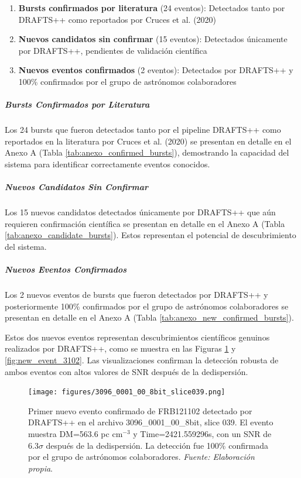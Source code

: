 \begin{enumerate}
    \item \textbf{Bursts confirmados por literatura} (24 eventos): Detectados tanto por DRAFTS++ como reportados por Cruces et al. (2020)
    \item \textbf{Nuevos candidatos sin confirmar} (15 eventos): Detectados únicamente por DRAFTS++, pendientes de validación científica
    \item \textbf{Nuevos eventos confirmados} (2 eventos): Detectados por DRAFTS++ y 100\% confirmados por el grupo de astrónomos colaboradores
\end{enumerate}

\subparagraph{Bursts Confirmados por Literatura}

Los 24 bursts que fueron detectados tanto por el pipeline DRAFTS++ como reportados en la literatura por Cruces et al. (2020) se presentan en detalle en el Anexo A (Tabla \ref{tab:anexo_confirmed_bursts}), demostrando la capacidad del sistema para identificar correctamente eventos conocidos.

\subparagraph{Nuevos Candidatos Sin Confirmar}

Los 15 nuevos candidatos detectados únicamente por DRAFTS++ que aún requieren confirmación científica se presentan en detalle en el Anexo A (Tabla \ref{tab:anexo_candidate_bursts}). Estos representan el potencial de descubrimiento del sistema.

\subparagraph{Nuevos Eventos Confirmados}

Los 2 nuevos eventos de bursts que fueron detectados por DRAFTS++ y posteriormente 100\% confirmados por el grupo de astrónomos colaboradores se presentan en detalle en el Anexo A (Tabla \ref{tab:anexo_new_confirmed_bursts}).

Estos dos nuevos eventos representan descubrimientos científicos genuinos realizados por DRAFTS++, como se muestra en las Figuras \ref{fig:new_event_3096} y \ref{fig:new_event_3102}. Las visualizaciones confirman la detección robusta de ambos eventos con altos valores de SNR después de la dedispersión.

\begin{figure}[H]
    \centering
    \texttt{[image: figures/3096\_0001\_00\_8bit\_slice039.png]}
    \caption{Primer nuevo evento confirmado de FRB121102 detectado por DRAFTS++ en el archivo 3096\_0001\_00\_8bit, slice 039. El evento muestra DM=563.6 pc cm$^{-3}$ y Time=2421.559296s, con un SNR de 6.3$\sigma$ después de la dedispersión. La detección fue 100\% confirmada por el grupo de astrónomos colaboradores. \textit{Fuente: Elaboración propia}.}
    \label{fig:new_event_3096}
\end{figure}

